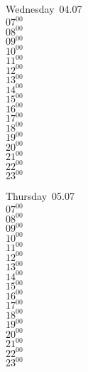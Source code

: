 \documentclass[11pt, a4paper]{book}\usepackage[]{graphicx}\usepackage[]{color}
\begin{document}
\begin{weekdaybox}
  Wednesday~04.07\\
  { 
  \vfill
  $07^{00}$\\
$08^{00}$\\
$09^{00}$\\
$10^{00}$\\
$11^{00}$\\
$12^{00}$\\
$13^{00}$\\
$14^{00}$\\
$15^{00}$\\
$16^{00}$\\
$17^{00}$\\
$18^{00}$\\
$19^{00}$\\
$20^{00}$\\
$21^{00}$\\
$22^{00}$\\
$23^{00}$\\
  }
\end{weekdaybox}
\clearpage
\begin{headerbox}
\end{headerbox}
\begin{weekdaybox}
  Thursday~05.07\\
  { 
  \vfill
  $07^{00}$\\
$08^{00}$\\
$09^{00}$\\
$10^{00}$\\
$11^{00}$\\
$12^{00}$\\
$13^{00}$\\
$14^{00}$\\
$15^{00}$\\
$16^{00}$\\
$17^{00}$\\
$18^{00}$\\
$19^{00}$\\
$20^{00}$\\
$21^{00}$\\
$22^{00}$\\
$23^{00}$\\
  }
\end{weekdaybox} 
\end{document}
